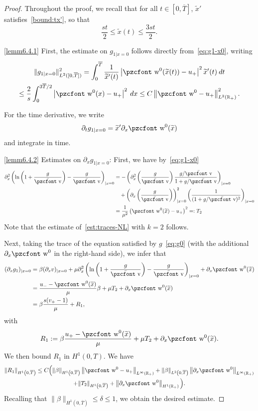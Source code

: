 \documentclass[10pt]{amsart}
\theoremstyle{definition}\newtheorem{defi}[theo]{Definition}\newtheorem{rema}[theo]{Remark}\newtheorem{exam}[theo]{Example}\newtheorem{exem}[theo]{Example}\newtheorem{nota}[theo]{Notation}
\newcommand{\mathpzc}[1]{\text{\pzcfont #1}}
\newcommand{\R}{\mathbb{R}}
\newcommand{\p}{\partial}
\newcommand{\bv}{\bar{\mathpzc{v}}}
\newcommand{\tw}{\mathpzc{w}}
\newcommand{\tx}{\widetilde{x}}
\begin{document}
\begin{proof}
Throughout the proof, we recall that for all $t\in [0, \overline{T}]$, $\tx'$ satisfies~\eqref{bound:tx'}, so that
\[
\frac{st}{2}\leq \tx(t)\leq \frac{3st}{2}.
\]

\noindent\eqref{lemm6.4.1} First, the estimate on $g_{1|x=0}$ follows directly from~\eqref{eq:g1-x0}, writing
\begin{multline*}
\|g_{1|x=0}\|_{L^2([0, \overline{T}])}^2=\int_0^{\overline{T}} \frac{1}{\tx'(t)}\left|\tw^0(\tx(t))-u_+\right|^2\tx'(t)\:dt\\
\leq \frac{2}{s}\int_0^{3 \overline{T}/2} \left|\tw^0(x)-u_+\right|^2 \:dx\leq C \left\|\tw^0-u_+\right\|_{L^2(\R_+)}^2.
\end{multline*}


For the time derivative, we write
\[
\partial_t g_{1|x=0}=\tx' \p_x \tw^0(\tx)
\]
and integrate in time.


\noindent\eqref{lemm6.4.2} Estimates on $\p_x g_{1|x=0}$: First, we have by~\eqref{eq:g1-x0}
\begin{equation}\label{eq:d2ln-x0}
\begin{split}
\partial^2_x \left(\ln \left(1+ \frac{g}{\bv}\right) -\frac{g}{\bv} \right)_{|x=0} & = - \left(\partial^2_x\left(\frac{g}{\bv}\right)\dfrac{g/\bv}{1+ g/\bv} \right)_{|x=0}\\
&\quad+ \left(\partial_x \left(\frac{g}{\bv}\right)\right)^2_{|x=0} \left(\dfrac{1}{(1+ g/\bv)^2}\right)_{|x=0}\\
& = \dfrac{1}{\mu^2} \left(\tw^0(\tx)-u_+\right)^2=:T_2
\end{split}
\end{equation}
Note that the estimate of~\eqref{est:traces-NL} with $k=2$ follows.


Next, taking the trace of the equation satisfied by $g$~\eqref{eq:g0} (with the additional $\partial_x \tw^0$ in the right-hand side), we infer that
\begin{align}\label{eq:dxg1-0}
(\partial_x g_1)_{|x=0} & = \beta (\partial_x v)_{|x=0} + \mu \partial^2_x \left(\ln \left(1+ \frac{g}{\bv}\right) -\frac{g}{\bv} \right)_{|x=0} + \partial_x \tw^0(\tx) \nonumber \\
& = \dfrac{u_- - \tw^0(\tx)}{\mu} \beta +\mu T_2+ \partial_x \tw^0(\tx)\\
& = \beta \dfrac{s(v_+ - 1)}{\mu} + R_1 \nonumber,
\end{align}
with
\[
R_1 := \beta \dfrac{u_+ - \tw^0(\tx)}{\mu} + \mu T_2 + \partial_x \tw^0(\tx).
\]
We then bound $R_1$ in $H^1(0,T)$. We have
\begin{multline*}
\|R_1\|_{H^1\left(0,\overline{T}\right)}  \leq C\Big(\|\beta\|_{H^1\left(0, \overline{T}\right)}\left\|\tw^0- u_+\right\|_{L^{\infty}(\R_+)} + \|\beta\|_{L^2\left(0, \overline{T}\right)} \left\|\p_x\tw^0\right\|_{L^\infty(\R_+)} \\
+ \|T_2\|_{H^1\left(0, \overline{T}\right)} + \left\|\p_x \tw^0\right\|_{H^1(\R_+)}\Big).
\end{multline*}
Recalling that $\|\beta\|_{H^1(0, \overline{T})}\leq \delta \leq 1$, we obtain the desired estimate.


\end{proof}
\end{document}
